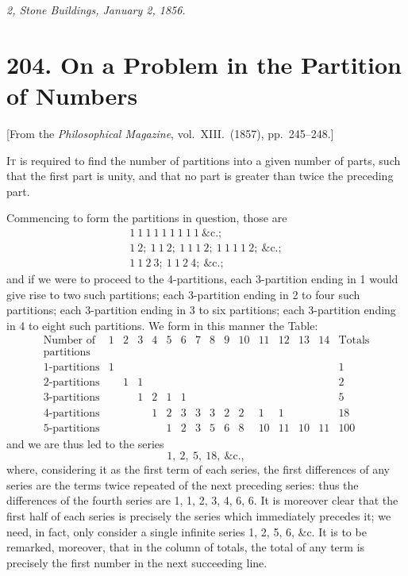 \documentclass[11pt,a4paper]{book}
\begin{document}
\bigskip

\noindent\textit{2, Stone Buildings, January 2, 1856.}

\newpage


\section*{204. On a Problem in the Partition of Numbers}

\begin{center}
[From the \textit{Philosophical Magazine}, vol.~XIII.~(1857), pp.~245--248.]
\end{center}

\bigskip

I\textsc{t} is required to find the number of partitions into a given number of parts,
such that the first part is unity, and that no part is greater than twice the preceding
part.

Commencing to form the partitions in question, those are
\[
\begin{array}{l}
1\ 1\ 1\ 1\ 1\ 1\ 1\ 1\ 1\ \&\textrm{c}.;\\
1\ 2;\ 1\ 1\ 2;\ 1\ 1\ 1\ 2;\ 1\ 1\ 1\ 1\ 2;\ \&\textrm{c}.;\\
1\ 1\ 2\ 3;\ 1\ 1\ 2\ 4;\ \&\textrm{c}.;
\end{array}
\]
and if we were to proceed to the 4-partitions, each 3-partition ending in 1 would give
rise to two such partitions; each 3-partition ending in 2 to four such partitions; each
3-partition ending in 3 to six partitions; each 3-partition ending in 4 to eight
such partitions. We form in this manner the Table:
\[
\begin{array}{c|*{14}{c}|c}
\text{Number of} & 1 & 2 & 3 & 4 & 5 & 6 & 7 & 8 & 9 & 10 & 11 & 12 & 13 & 14 & \text{Totals}\\
\text{partitions} & & & & & & & & & & & & & & &\\
\hline
1\text{-partitions} & 1 & & & & & & & & & & & & & & 1\\
2\text{-partitions} & & 1 & 1 & & & & & & & & & & & & 2\\
3\text{-partitions} & & & 1 & 2 & 1 & 1 & & & & & & & & & 5\\
4\text{-partitions} & & & & 1 & 2 & 3 & 3 & 3 & 2 & 2 & 1 & 1 & & & 18\\
5\text{-partitions} & & & & & 1 & 2 & 3 & 5 & 6 & 8 & 10 & 11 & 10 & 11 & 100
\end{array}
\]
and we are thus led to the series
\[
1,\ 2,\ 5,\ 18,\ \&\textrm{c.},
\]
where, considering it as the first term of each series, the first differences of any series
are the terms twice repeated of the next preceding series: thus the differences of the
fourth series are 1, 1, 2, 3, 4, 6, 6. It is moreover clear that the first half of
each series is precisely the series which immediately precedes it; we need, in fact,
only consider a single infinite series 1, 2, 5, 6, \&c. It is to be remarked, moreover,
that in the column of totals, the total of any term is precisely the first number in
the next succeeding line.
\end{document}
